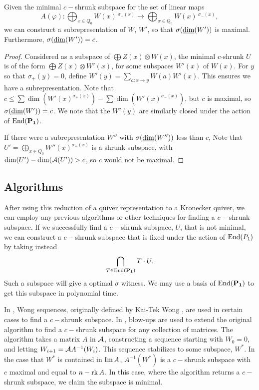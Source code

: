 \begin{theorem}
Given the minimal $c-$shrunk subspace for the set of linear maps
$$A(\varphi):\bigoplus_{x\in Q_0} W(x)\,^{\sigma_+(x)}\rightarrow\bigoplus_{x\in Q_0}W(x)\,^{\sigma_-(x)},$$
we can construct a subrepresentation of $W$, $W'$, so that $\sigma(\underline{\rm dim}(W'))$ is maximal. Furthermore, $\sigma(\underline{\rm dim}(W'))=c$. 
\end{theorem}

\begin{proof}
Considered as a subspace of $\bigoplus Z(x)\otimes W(x)$, the minimal $c$-shrunk $U$ is of the form $\bigoplus Z(x)\otimes W'(x)$, for some subspaces $W'(x)$ of $W(x)$. For $y$ so that $\sigma_+(y)=0$, define $\displaystyle W'(y)=\sum_{a:x\rightarrow y}W(a)W'(x)$. This ensures we have a subrepresentation. Note that $c\leq \sum\dim(W'(x)^{\sigma_+(x)})-\sum\dim(W'(x)^{\sigma_-(x)})$, but $c$ is maximal, so $\sigma(\underline{\rm dim}(W'))=c$. We note that the $W'(y)$ are similarly closed under the action of $\operatorname{End}(\mathbf{P_1})$.

If there were a subrepresentation $W''$ with $\sigma(\underline{\rm dim}(W''))$ less than $c$, Note that $U'=\displaystyle\bigoplus_{x\in Q_0} W''(x)^{\sigma_+(x)}$ is a shrunk subspace, with $\dim(U')-\dim(\mathcal{A}( U'))>c$, so $c$ would not be maximal.
\end{proof}

\subsection{Algorithms}

After using this reduction of a quiver representation to a Kronecker quiver, we can employ any previous algorithms or other techniques for finding a $c-$shrunk subspace. 
 If we successfully find a $c-$shrunk subspace, $U$, that is not minimal, we can construct a $c-$shrunk subspace that is fixed under the action of $\operatorname{End}(P_1)$ by taking instead $$\bigcap_{T\in \operatorname{End}(\mathbf{P_1})}T\cdot U.$$ Such a subspace will give a optimal $\sigma$ witness. We may use a basis of $\operatorname{End}(\mathbf{P_1})$ to get this subspace in polynomial time. 
 
 In \cite{IKQS15}, Wong sequences, originally defined by Kai-Tek Wong \cite{Wong74}, are used in certain cases to find a $c-$shrunk subspace. In \cite{IQS17}, blow-ups are used to extend the original algorithm to find a $c-$shrunk subspace for any collection of matrices. The algorithm takes a matrix $A$ in $\mathcal{A}$, constructing a sequence starting with $W_0=0$, and letting $W_{i+1}=\mathcal{A} A^{-1}(W_i)$. This sequence stabilizes to some subspace, $W^*$. In the case that $W^*$ is contained in $\operatorname{Im}{A}$, $A^{-1}(W^*)$ is a $c-$shrunk subspace with $c$ maximal and equal to $n-\operatorname{rk}{A}$. In this case, where the algorithm returns a $c-$shrunk subspace, we claim the subspace is minimal.

